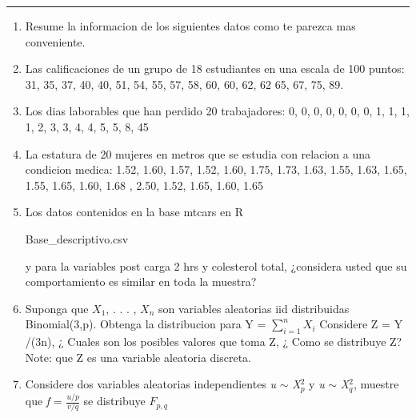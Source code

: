 \documentclass[11pt]{article}
\begin{document}

\Large


\medskip\hrule
\vspace{1cm}

\begin{enumerate}
    \item Resume la informacion de los siguientes datos como te parezca mas conveniente.
    \item Las calificaciones de un grupo de 18 estudiantes en una escala de 100 puntos: 31, 35, 37, 40, 40, 51, 54, 55,
57, 58, 60, 60, 62, 62 65, 67, 75, 89.
\item Los dias laborables que han perdido 20 trabajadores: 0, 0, 0, 0, 0, 0, 0, 1, 1, 1, 1, 2, 3, 3, 4, 4, 5, 5, 8, 45

\item La estatura de 20 mujeres en metros que se estudia con relacion a una condicion medica: 1.52, 1.60, 1.57, 1.52, 1.60, 1.75, 1.73, 1.63, 1.55, 1.63, 1.65, 1.55, 1.65, 1.60, 1.68 , 2.50, 1.52, 1.65, 1.60, 1.65

\item Los datos contenidos en la base mtcars en R 
\begin{center}
    Base\_descriptivo.csv
\end{center}
y para la variables post carga 2 hrs y colesterol total, ¿considera usted que su comportamiento es similar
en toda la muestra?

\item Suponga que $X_{1}$, . . . , $X_{n}$ son variables aleatorias iid distribuidas Binomial(3,p). Obtenga la distribucion para Y =
$\sum_{i=1}^{n} X_{i}$ Considere Z = Y /(3n), ¿ Cuales son los posibles valores que toma Z, ¿ Como se distribuye Z? Note: que Z es una variable aleatoria discreta.

\item Considere dos variables aleatorias independientes \textit{u} $\sim$ \textit{X}$_{p}^{2}$ y \textit{u} $\sim$ \textit{X}$_{q}^{2}$, muestre que \textit{f} = $\frac{u/p}{v/q}$ se distribuye $F_{p,q}$

\end{enumerate}
\end{document}
